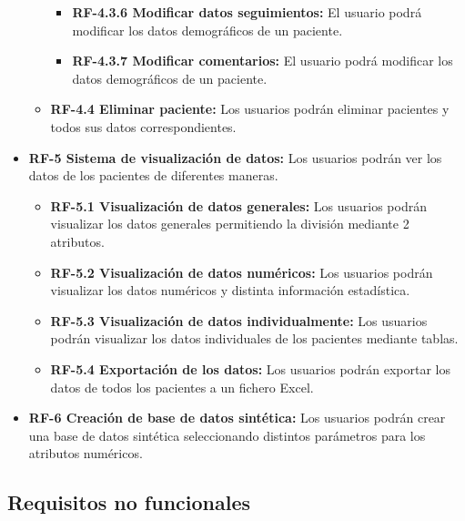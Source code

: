 \begin{itemize}
\begin{itemize}
\begin{itemize}
            \item \textbf{RF-4.3.6 Modificar datos seguimientos:} El usuario podrá modificar los datos demográficos de un paciente.
            \item \textbf{RF-4.3.7 Modificar comentarios:} El usuario podrá modificar los datos demográficos de un paciente.
        \end{itemize}
        \item \textbf{RF-4.4 Eliminar paciente:} Los usuarios podrán eliminar pacientes y todos sus datos correspondientes.
    \end{itemize}
	\item \textbf{RF-5 Sistema de visualización de datos:} Los usuarios podrán ver los datos de los pacientes de diferentes maneras.
	\begin{itemize}
	    \item \textbf{RF-5.1 Visualización de datos generales:} Los usuarios podrán visualizar los datos generales permitiendo la división mediante 2 atributos.
	    \item \textbf{RF-5.2 Visualización de datos numéricos:} Los usuarios podrán visualizar los datos numéricos y distinta información estadística.
	    \item \textbf{RF-5.3 Visualización de datos individualmente:}  Los usuarios podrán visualizar los datos individuales de los pacientes mediante tablas.
	    \item \textbf{RF-5.4 Exportación de los datos:} Los usuarios podrán exportar los datos de todos los pacientes a un fichero Excel.
	\end{itemize}
	\item \textbf{RF-6 Creación de base de datos sintética:} Los usuarios podrán crear una base de datos sintética seleccionando distintos parámetros para los atributos numéricos.
\end{itemize}

\subsection{Requisitos no funcionales}

